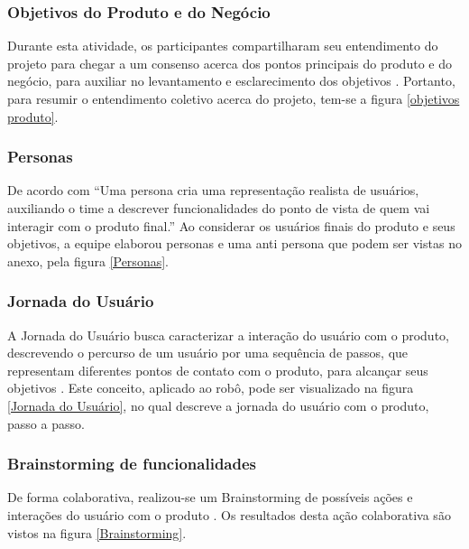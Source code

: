  \subsubsection{Objetivos do Produto e do Negócio}
 Durante esta atividade, os participantes compartilharam seu entendimento do projeto para chegar a um consenso acerca dos pontos principais do produto e do negócio, para auxiliar no levantamento e esclarecimento dos objetivos \cite{caroli}. Portanto, para resumir o entendimento coletivo acerca do projeto, tem-se a figura \ref{objetivos produto}.
 
 \subsubsection{Personas}
 De acordo com \cite{caroli} “Uma persona cria uma representação realista de usuários, auxiliando o time a descrever funcionalidades do ponto de vista de quem vai interagir com o produto final.” Ao considerar os usuários finais do produto e seus objetivos, a equipe elaborou personas e uma anti persona que podem ser vistas no anexo, pela figura \ref{Personas}.

 \subsubsection{Jornada do Usuário}
 A Jornada do Usuário busca caracterizar a interação do usuário com o produto, descrevendo o percurso de um usuário por uma sequência de passos, que representam diferentes pontos de contato com o produto, para alcançar seus objetivos \cite{caroli}. Este conceito, aplicado ao robô, pode ser visualizado na figura \ref{Jornada do Usuário}, no qual descreve a jornada do usuário com o produto, passo a passo.
 
\subsubsection{Brainstorming de funcionalidades}
De forma colaborativa, realizou-se um Brainstorming de possíveis ações e interações do usuário com o produto \cite{caroli}.  Os resultados desta ação colaborativa são vistos na figura \ref{Brainstorming}.

